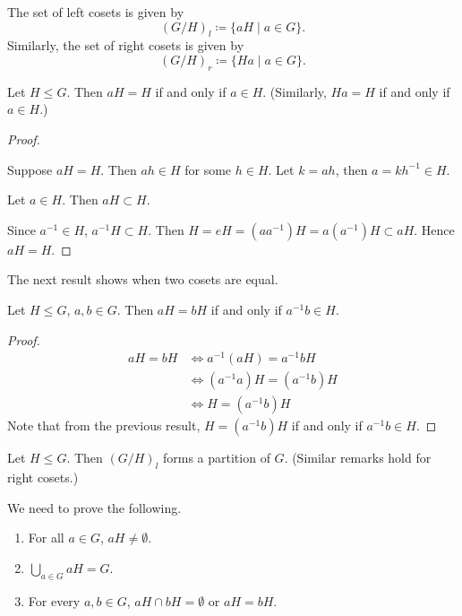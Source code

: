 The set of left cosets is given by
\[(G/H)_{l}\coloneqq\{aH\mid a\in G\}.\]
Similarly, the set of right cosets is given by
\[(G/H)_{r}\coloneqq\{Ha\mid a\in G\}.\]

\begin{lemma}
Let $H\le G$. Then $aH=H$ if and only if $a\in H$. (Similarly, $Ha=H$ if and only if $a\in H$.)
\end{lemma}

\begin{proof} \

\fbox{$\implies$} Suppose $aH=H$. Then $ah\in H$ for some $h\in H$. Let $k=ah$, then $a=kh^{-1}\in H$.

\fbox{$\impliedby$} Let $a\in H$. Then $aH\subset H$.

Since $a^{-1}\in H$, $a^{-1}H\subset H$. Then $H=eH=(aa^{-1})H=a(a^{-1})H\subset aH$. Hence $aH=H$.
\end{proof}

The next result shows when two cosets are equal.
\begin{lemma}
Let $H\le G$, $a,b\in G$. Then $aH=bH$ if and only if $a^{-1}b\in H$.
\end{lemma}

\begin{proof}
\begin{align*}
aH=bH&\iff a^{-1}(aH)=a^{-1}bH\\
&\iff (a^{-1}a)H=(a^{-1}b)H\\
&\iff H=(a^{-1}b)H
\end{align*}
Note that from the previous result, $H=(a^{-1}b)H$ if and only if $a^{-1}b\in H$.
\end{proof}

\begin{proposition}
Let $H\le G$. Then $(G/H)_l$ forms a partition of $G$. (Similar remarks hold for right cosets.)
\end{proposition}

We need to prove the following.
\begin{enumerate}[label=(\roman*)]
\item For all $a\in G$, $aH\neq\emptyset$.
\item $\bigcup_{a\in G}aH=G$.
\item For every $a,b\in G$, $aH\cap bH=\emptyset$ or $aH=bH$.
\end{enumerate}

